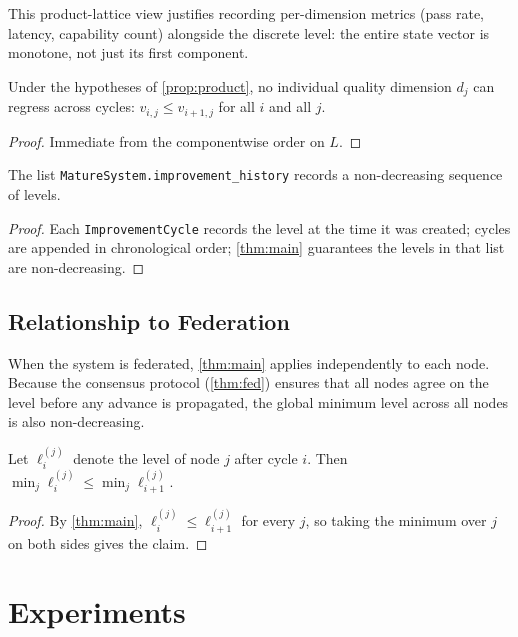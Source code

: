 \documentclass[11pt]{article}
\begin{document}
This product-lattice view justifies recording per-dimension metrics
(pass rate, latency, capability count) alongside the discrete level: the
entire state vector is monotone, not just its first component.

\begin{corollary}\label{cor:dimwise}
Under the hypotheses of \cref{prop:product}, no individual quality
dimension $d_j$ can regress across cycles:
$v_{i,j} \leq v_{i+1,j}$ for all $i$ and all $j$.
\end{corollary}
\begin{proof}
Immediate from the componentwise order on $L$.
\end{proof}

\begin{corollary}\label{cor:hist}
The list \texttt{MatureSystem.improvement\_history} records a non-decreasing
sequence of levels.
\end{corollary}
\begin{proof}
Each \texttt{ImprovementCycle} records the level at the time it was created;
cycles are appended in chronological order; \cref{thm:main} guarantees the
levels in that list are non-decreasing.
\end{proof}

\subsection{Relationship to Federation}

When the system is federated, \cref{thm:main} applies independently to each
node.  Because the consensus protocol (\cref{thm:fed}) ensures that all
nodes agree on the level before any advance is propagated, the global
minimum level across all nodes is also non-decreasing.

\begin{proposition}\label{prop:global}
Let $\ell_i^{(j)}$ denote the level of node $j$ after cycle $i$.  Then
$\min_j \ell_i^{(j)} \leq \min_j \ell_{i+1}^{(j)}$.
\end{proposition}
\begin{proof}
By \cref{thm:main}, $\ell_i^{(j)} \leq \ell_{i+1}^{(j)}$ for every $j$,
so taking the minimum over $j$ on both sides gives the claim.
\end{proof}

\section{Experiments}\label{sec:experiments}
\end{document}
